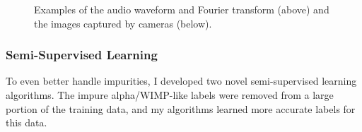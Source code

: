 \documentclass[12pt]{article}
\begin{document}
\begin{figure}[ht]
    \centering
    \qquad
    \caption{Examples of the audio waveform and Fourier transform (above) and the images captured by cameras (below).}
\end{figure}

\subsubsection{Semi-Supervised Learning}

To even better handle impurities, I developed two novel semi-supervised learning algorithms. The impure alpha/WIMP-like labels were removed from a large portion of the training data, and my algorithms learned more accurate labels for this data.
\end{document}
